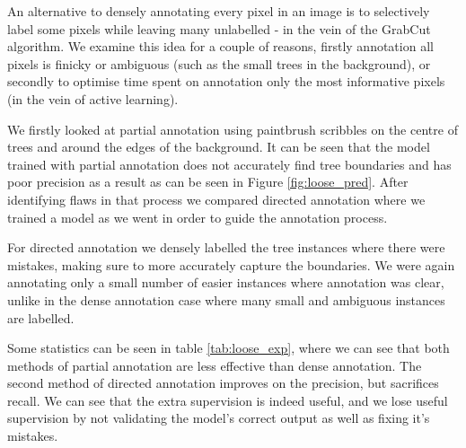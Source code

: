 An alternative to densely annotating every pixel in an image is to selectively label some pixels while leaving many unlabelled - in the vein of the GrabCut algorithm. We examine this idea for a couple of reasons, firstly annotation all pixels is finicky or ambiguous (such as the small trees in the background), or secondly to optimise time spent on annotation only the most informative pixels (in the vein of active learning).

We firstly looked at partial annotation using paintbrush scribbles on the centre of trees and around the edges of the background. It can be seen that the model trained with partial annotation does not accurately find tree boundaries and has poor precision as a result as can be seen in Figure \ref{fig:loose_pred}. After identifying flaws in that process we compared directed annotation where we trained a model as we went in order to guide the annotation process.

For directed annotation we densely labelled the tree instances where there were mistakes, making sure to more accurately capture the boundaries. We were again annotating only a small number of easier instances where annotation was clear, unlike in the dense annotation case where many small and ambiguous instances are labelled.

Some statistics can be seen in table \ref{tab:loose_exp}, where we can see that both methods of partial annotation are less effective than dense annotation. The second method of directed annotation improves on the precision, but sacrifices recall. We can see that the extra supervision is indeed useful, and we lose useful supervision by not validating the model's correct output as well as fixing it's mistakes.


\begin{table}[!ht]
  \centering
    \caption{Statistics from re-annotation test set}

\noindent{}

\label{tab:loose_exp}
\end{table}






